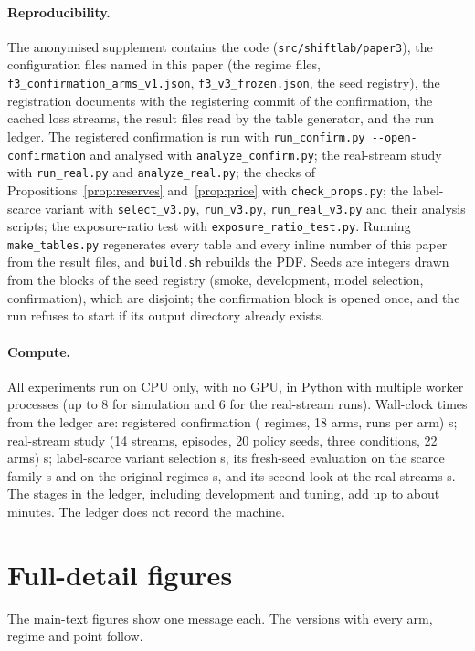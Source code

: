 \documentclass[10pt]{article}
\theoremstyle{plain}
\theoremstyle{definition}
\begin{document}
\paragraph{Reproducibility.}
The anonymised supplement contains the code (\texttt{src/shiftlab/paper3}), the configuration files named in this paper (the regime files, \texttt{f3\_confirmation\_arms\_v1.json}, \texttt{f3\_v3\_frozen.json}, the seed registry), the registration documents with the registering commit of the confirmation, the cached loss streams, the result files read by the table generator, and the run ledger. The registered confirmation is run with \texttt{run\_confirm.py -{}-open-confirmation} and analysed with \texttt{analyze\_confirm.py}; the real-stream study with \texttt{run\_real.py} and \texttt{analyze\_real.py}; the checks of Propositions~\ref{prop:reserves} and~\ref{prop:price} with \texttt{check\_props.py}; the label-scarce variant with \texttt{select\_v3.py}, \texttt{run\_v3.py}, \texttt{run\_real\_v3.py} and their analysis scripts; the exposure-ratio test with \texttt{exposure\_ratio\_test.py}. Running \texttt{make\_tables.py} regenerates every table and every inline number of this paper from the result files, and \texttt{build.sh} rebuilds the PDF. Seeds are integers drawn from the blocks of the seed registry (smoke, development, model selection, confirmation), which are disjoint; the confirmation block is opened once, and the run refuses to start if its output directory already exists.

\paragraph{Compute.}
All experiments run on CPU only, with no GPU, in Python with multiple worker processes (up to $8$ for simulation and $6$ for the real-stream runs). Wall-clock times from the ledger are: registered confirmation (\NRegimes{} regimes, 18 arms, \NRunsPerArm{} runs per arm) \WallConfirm{} s; real-stream study (14 streams, \NStreamEpisodes{} episodes, 20 policy seeds, three conditions, 22 arms) \WallReal{} s; label-scarce variant selection \WallVSel{} s, its fresh-seed evaluation on the scarce family \WallVScarce{} s and on the original regimes \WallVOrig{} s, and its second look at the real streams \WallVReal{} s. The \NLedgerStages{} stages in the ledger, including development and tuning, add up to about \WallTotalMin{} minutes. The ledger does not record the machine.

\clearpage\section{Full-detail figures}\label{app:figs}
The main-text figures show one message each. The versions with every arm, regime and point follow.




\end{document}
